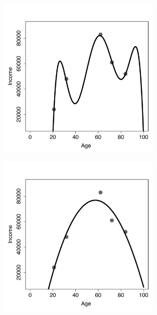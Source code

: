 \documentclass[xcolor={table}]{beamer}
\begin{document}
 \begin{frame} 

\begin{figure}[!htb]
       \begin{centering}
	\includegraphics[width=0.7\textwidth]{images/IntroOverfittingUnderfittingPlot4.pdf}
       \label{fig:ageIncome}
       \end{centering}
\end{figure}

\end{frame} 

 \begin{frame} 

\begin{figure}[!htb]
       \begin{centering}
	\includegraphics[width=0.7\textwidth]{images/IntroOverfittingUnderfittingPlot3.pdf}
       \label{fig:ageIncome}
       \end{centering}
\end{figure}

\end{frame} 
\end{document}
